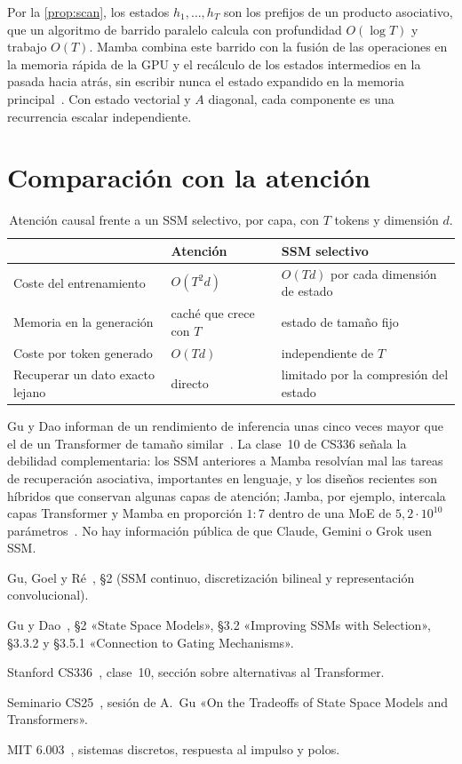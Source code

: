 Por la \cref{prop:scan}, los estados $h_1,\dots,h_T$ son los prefijos de un producto asociativo, que un algoritmo de barrido paralelo calcula con profundidad $O(\log T)$ y trabajo $O(T)$. Mamba combina este barrido con la fusión de las operaciones en la memoria rápida de la GPU y el recálculo de los estados intermedios en la pasada hacia atrás, sin escribir nunca el estado expandido en la memoria principal~\cite[§3.3.2]{mamba}. Con estado vectorial y $A$ diagonal, cada componente es una recurrencia escalar independiente.

\section{Comparación con la atención}

\begin{table}[ht]
\centering\small
\caption{Atención causal frente a un SSM selectivo, por capa, con $T$ tokens y dimensión $d$.}\label{tab:ssm}
\begin{tabular}{@{}lll@{}}
\toprule
& Atención & SSM selectivo \\
\midrule
Coste del entrenamiento & $O(T^{2}d)$ & $O(Td)$ por cada dimensión de estado \\
Memoria en la generación & caché que crece con $T$ & estado de tamaño fijo \\
Coste por token generado & $O(Td)$ & independiente de $T$ \\
Recuperar un dato exacto lejano & directo & limitado por la compresión del estado \\
\bottomrule
\end{tabular}
\end{table}

Gu y Dao informan de un rendimiento de inferencia unas cinco veces mayor que el de un Transformer de tamaño similar~\cite[§4.5]{mamba}. La clase~10 de CS336 señala la debilidad complementaria: los SSM anteriores a Mamba resolvían mal las tareas de recuperación asociativa, importantes en lenguaje, y los diseños recientes son híbridos que conservan algunas capas de atención; Jamba, por ejemplo, intercala capas Transformer y Mamba en proporción $1:7$ dentro de una MoE de $5{,}2\cdot 10^{10}$ parámetros~\cite{cs336,jamba}. No hay información pública de que Claude, Gemini o Grok usen SSM.

\begin{lecturas}
\item Gu, Goel y Ré~\cite{s4}, §2 (SSM continuo, discretización bilineal y representación convolucional).
\item Gu y Dao~\cite{mamba}, §2 «State Space Models», §3.2 «Improving SSMs with Selection», §3.3.2 y §3.5.1 «Connection to Gating Mechanisms».
\item Stanford CS336~\cite{cs336}, clase~10, sección sobre alternativas al Transformer.
\item Seminario CS25~\cite{cs25}, sesión de A.~Gu «On the Tradeoffs of State Space Models and Transformers».
\item MIT 6.003~\cite{mit6003}, sistemas discretos, respuesta al impulso y polos.
\end{lecturas}

